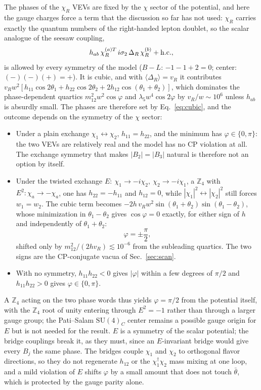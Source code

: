 \documentclass[submission, Phys]{SciPost}
\newcommand{\SU}{\mathrm{SU}}
\newcommand{\Z}{\mathbb{Z}}
\newcommand{\bt}{\bar\theta}
\newcommand{\vev}[1]{\langle #1\rangle}
\begin{document}
The phases of the $\chi_R$ VEVs are fixed by the $\chi$ sector of the
potential, and here the gauge charges force a term that the discussion
so far has not used: $\chi_R$ carries exactly the quantum numbers of
the right-handed lepton doublet, so the scalar analogue of the seesaw
coupling,
\begin{equation}
  h_{ab}\,\chi^{(a)T}_R\,i\sigma_2\,\Delta_R\,\chi^{(b)}_R+{\rm h.c.},
  \label{eq:cubic}
\end{equation}
is allowed by every symmetry of the model ($B-L$: $-1-1+2=0$; center:
$(-)(-)(+)=+$). It is cubic, and with $\vev{\Delta_R}=v_R$ it contributes
$v_R w^2[h_{11}\cos2\theta_1+h_{22}\cos2\theta_2+2h_{12}\cos(\theta_1+\theta_2)]$,
which dominates the phase-dependent quartics
$m_{12}^2w^2\cos\varphi$ and $\lambda_5w^4\cos2\varphi$ by $v_R/w\sim10^6$
unless $h_{ab}$ is absurdly small. The phases are therefore set by
Eq.~\eqref{eq:cubic}, and the outcome depends on the symmetry of the
$\chi$ sector:
\begin{itemize}
\item Under a plain exchange $\chi_1\leftrightarrow\chi_2$, $h_{11}=h_{22}$,
  and the minimum has $\varphi\in\{0,\pi\}$: the two VEVs are relatively
  real and the model has no CP violation at all. The exchange symmetry
  that makes $|B_2|=|B_3|$ natural is therefore not an option by
  itself.
\item Under the twisted exchange $E:\ \chi_1\to-i\chi_2,\ \chi_2\to-i\chi_1$,
  a $\Z_4$ with $E^2:\chi_a\to-\chi_a$, one has $h_{22}=-h_{11}$ and
  $h_{12}=0$, while $|\chi_1|^2\leftrightarrow|\chi_2|^2$ still forces
  $w_1=w_2$. The cubic term becomes
  $-2h\,v_Rw^2\sin(\theta_1+\theta_2)\sin(\theta_1-\theta_2)$, whose
  minimization in $\theta_1-\theta_2$ gives $\cos\varphi=0$ exactly, for
  either sign of $h$ and independently of $\theta_1+\theta_2$:
  \begin{equation}
    \varphi=\pm\frac{\pi}{2},
    \label{eq:phiquant}
  \end{equation}
  shifted only by $m_{12}^2/(2hv_R)\lesssim10^{-6}$ from the subleading
  quartics. The two signs are the CP-conjugate vacua of
  Sec.~\ref{sec:scan}.
\item With no symmetry, $h_{11}h_{22}<0$ gives $|\varphi|$ within a few
  degrees of $\pi/2$ and $h_{11}h_{22}>0$ gives $\varphi\in\{0,\pi\}$.
\end{itemize}
A $\Z_4$ acting on the two phase words thus yields $\varphi=\pi/2$ from
the potential itself, with the $\Z_4$ root of unity entering through
$E^2=-1$ rather than through a larger gauge group; the Pati--Salam
$\SU(4)_C$ center remains a possible gauge origin for $E$ but is not
needed for the result. $E$ is a symmetry of the scalar potential; the
bridge couplings break it, as they must, since an $E$-invariant bridge
would give every $B_j$ the same phase. The bridges couple $\chi_1$ and
$\chi_2$ to orthogonal flavor directions, so they do not regenerate
$h_{12}$ or the $\chi_1^\dagger\chi_2$ mass mixing at one loop, and a
mild violation of $E$ shifts $\varphi$ by a small amount that does not
touch $\bt$, which is protected by the gauge parity alone.
\end{document}
